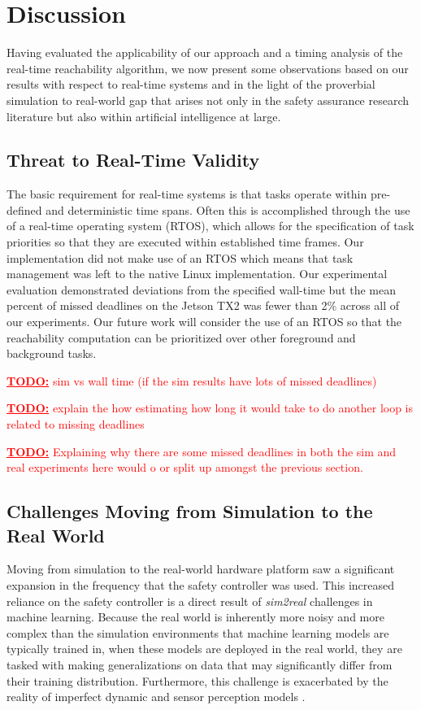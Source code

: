 \documentclass[manuscript,screen,review]{acmart}
\newcommand{\todo}[1]{\textcolor{red}{\textbf{\underline{TODO:}} #1}}
\begin{document}
\section{Discussion}

Having evaluated the applicability of our approach and a timing analysis of the real-time reachability algorithm, we now present some observations based on our results with respect to real-time systems and in the light of the proverbial simulation to real-world gap  that arises not only in the safety assurance research literature but also within artificial intelligence at large.

\subsection{Threat to Real-Time Validity}

The basic requirement for real-time systems is that tasks operate within pre-defined and deterministic time spans. Often this is accomplished through the use of a real-time operating system (RTOS), which allows for the specification of task priorities so that they are executed within established time frames. Our implementation did not make use of an RTOS which means that task management was left to the native Linux implementation. Our experimental evaluation demonstrated deviations from the specified wall-time but the mean percent of missed deadlines on the Jetson TX2 was fewer than 2\% across all of our experiments. Our future work will consider the use of an RTOS so that the reachability computation can be prioritized over other foreground and background tasks.

\todo{sim vs wall time (if the sim results have lots of missed deadlines)}

\todo{explain the how estimating how long it would take to do another loop is related to missing deadlines}

\todo{Explaining why there are some missed deadlines in both the sim and real experiments here would o or split up amongst the previous section.}

\subsection{Challenges Moving from Simulation to the Real World}

Moving from simulation to the real-world hardware platform saw a significant expansion in the frequency that the safety controller was used. This increased reliance on the safety controller is a direct result of \emph{sim2real} challenges in machine learning. Because the real world is inherently more noisy and more complex than the simulation environments that machine learning models are typically trained in, when these models are deployed in the real world, they are tasked with making generalizations on data that may significantly differ from their training distribution. Furthermore, this challenge is exacerbated by the reality of imperfect dynamic and sensor perception models \cite{ivanov2020case}.
\end{document}
